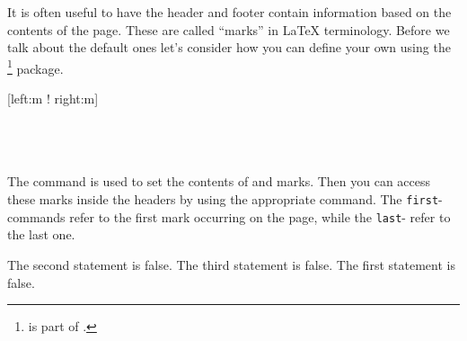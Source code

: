 It is often useful to have the header and footer contain information based on
the contents of the page. These are called \enquote{marks} in \LaTeX{}
terminology. Before we talk about the default ones let's consider how you can
define your own using the \footnote{ is part
of .} package.
\begin{lscommand}
  [left:m ! right:m] \\
   \\
   \\
   \\
\end{lscommand}
The  command is used to set the contents of  and 
marks. Then you can access these marks inside the headers by using the appropriate
command. The \texttt{first}- commands refer to the first mark occurring on the
page, while the \texttt{last}- refer to the last one.
\begin{example}[standalone, paperheight=4cm]
\geometry{includehead, includefoot, headsep=.5em, footskip=1em} %
\sloppy %
\usepackage{fancyhdr}%
\usepackage{extramarks}
\pagestyle{fancy}%

\fancyhead[L]{\firstleftxmark}
\fancyhead[R]{\lastleftxmark}
\fancyfoot[L]{\firstrightxmark}
\fancyfoot[R]{\lastrightxmark}

\noindent %
The second statement is false.
The third statement is false.
The first statement is false.
\end{example}

